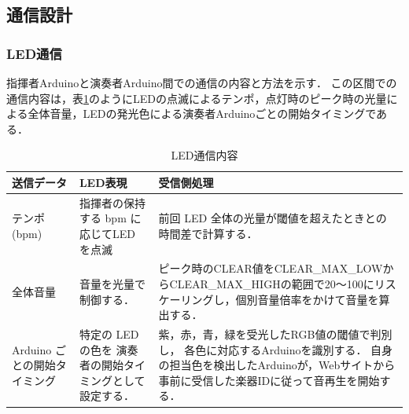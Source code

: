 \documentclass[lualatex,book,openany,paper=a4paper,jafontsize=11.5pt,jafontscale=1.05]{jlreq}
\begin{document}
\subsection{通信設計}
\subsubsection{LED通信}
指揮者Arduinoと演奏者Arduino間での通信の内容と方法を示す．
この区間での通信内容は，表\ref{tab:led_data}のようにLEDの点滅によるテンポ，点灯時のピーク時の光量による全体音量，LEDの発光色による演奏者Arduinoごとの開始タイミングである．
\begin{table}[H]
  \centering
  \caption{LED通信内容}
  \label{tab:led_data}
  \renewcommand{\arraystretch}{1.3}
  \begin{tabular}{|p{3cm}|p{4cm}|>{\raggedright\arraybackslash}p{7cm}|}
    \hline
    送信データ & LED表現 & 受信側処理 \\\hline
    テンポ(bpm)&指揮者の保持する bpm に応じてLED を点滅&前回 LED 全体の光量が閾値を超えたときとの時間差で計算する．\\ \hline
    全体音量 & 音量を光量で制御する． &
    ピーク時のCLEAR値をCLEAR\_MAX\_LOWからCLEAR\_MAX\_HIGHの範囲で20〜100にリスケーリングし，個別音量倍率をかけて音量を算出する．
    \\ \hline

    Arduino ごとの開始タイミング
    &
    特定の LED の色を
    演奏者の開始タイミングとして設定する．
    &

    紫，赤，青，緑を受光したRGB値の閾値で判別し，
    各色に対応するArduinoを識別する．
    自身の担当色を検出したArduinoが，Webサイトから
    事前に受信した楽器IDに従って音再生を開始する．\\ \hline

  \end{tabular}
\end{table}
\end{document}
